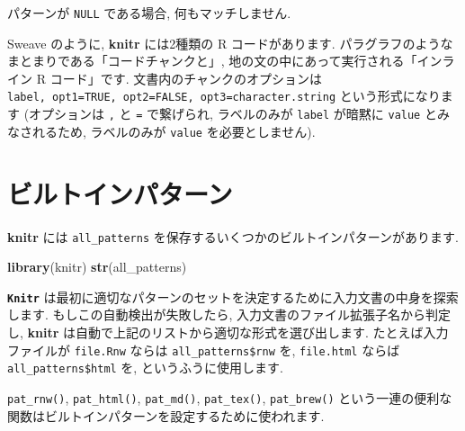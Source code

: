 \documentclass[
  lualatex,ja=standard,jafont=noto-otf]{bxjsreport}
\newenvironment{Shaded}{\begin{snugshade}}{\end{snugshade}}
\newcommand{\FunctionTok}[1]{\textcolor[rgb]{0.13,0.29,0.53}{\textbf{#1}}}
\newcommand{\NormalTok}[1]{#1}
\begin{document}
パターンが \texttt{NULL} である場合, 何もマッチしません.

Sweave のように, \textbf{knitr} には2種類の R コードがあります.
パラグラフのようなまとまりである「コードチャンクと」,
地の文の中にあって実行される「インライン R コード」です.
文書内のチャンクのオプションは
\texttt{label,\ opt1=TRUE,\ opt2=FALSE,\ opt3=\textquotesingle{}character.string\textquotesingle{}}
という形式になります (オプションは \texttt{,} と \texttt{=} で繋げられ,
ラベルのみが \texttt{label} が暗黙に \texttt{value} とみなされるため,
ラベルのみが \texttt{value} を必要としません).

\hypertarget{ux30d3ux30ebux30c8ux30a4ux30f3ux30d1ux30bfux30fcux30f3}{%
\section{ビルトインパターン}\label{ux30d3ux30ebux30c8ux30a4ux30f3ux30d1ux30bfux30fcux30f3}}

\textbf{knitr} には \texttt{all\_patterns}
を保存するいくつかのビルトインパターンがあります.

\begin{Shaded}
\begin{Highlighting}[numbers=left,,]
\FunctionTok{library}\NormalTok{(knitr)}
\FunctionTok{str}\NormalTok{(all\_patterns)}
\end{Highlighting}
\end{Shaded}

\textbf{\texttt{Knitr}}
は最初に適切なパターンのセットを決定するために入力文書の中身を探索します.
もしこの自動検出が失敗したら, 入力文書のファイル拡張子名から判定し,
\textbf{knitr} は自動で上記のリストから適切な形式を選び出します.
たとえば入力ファイルが \texttt{file.Rnw} ならは
\texttt{all\_patterns\$rnw} を, \texttt{file.html} ならば
\texttt{all\_patterns\$html} を, というふうに使用します.

\texttt{pat\_rnw()}, \texttt{pat\_html()}, \texttt{pat\_md()},
\texttt{pat\_tex()}, \texttt{pat\_brew()}
という一連の便利な関数はビルトインパターンを設定するために使われます.
\end{document}
